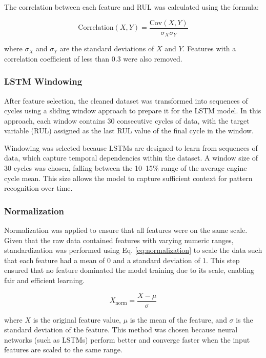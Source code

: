 \documentclass[conference]{IEEEtran}
\begin{document}
The correlation between each feature and RUL was calculated using the formula:

\begin{equation}
\text{Correlation}(X,Y) = \frac{\text{Cov}(X,Y)}{\sigma_X \sigma_Y}
\label{eq:correlation}
\end{equation}

where $\sigma_X$ and $\sigma_Y$ are the standard deviations of $X$ and $Y$. Features with a correlation coefficient of less than 0.3 were also removed.

\subsubsection{LSTM Windowing}
After feature selection, the cleaned dataset was transformed into sequences of cycles using a sliding window approach \cite{ref6}\cite{ref7} to prepare it for the LSTM model. In this approach, each window contains 30 consecutive cycles of data, with the target variable (RUL) assigned as the last RUL value of the final cycle in the window.

Windowing was selected because LSTMs are designed to learn from sequences of data, which capture temporal dependencies within the dataset. A window size of 30 cycles was chosen, falling between the 10--15\% range of the average engine cycle mean. This size allows the model to capture sufficient context for pattern recognition over time.

\subsubsection{Normalization}
Normalization was applied to ensure that all features were on the same scale. Given that the raw data contained features with varying numeric ranges, standardization was performed using Eq. \eqref{eq:normalization} to scale the data such that each feature had a mean of 0 and a standard deviation of 1. This step ensured that no feature dominated the model training due to its scale, enabling fair and efficient learning.

\begin{equation}
X_{\text{norm}} = \frac{X - \mu}{\sigma}
\label{eq:normalization}
\end{equation}

where $X$ is the original feature value, $\mu$ is the mean of the feature, and $\sigma$ is the standard deviation of the feature. This method was chosen because neural networks (such as LSTMs) perform better and converge faster when the input features are scaled to the same range.
\end{document}
